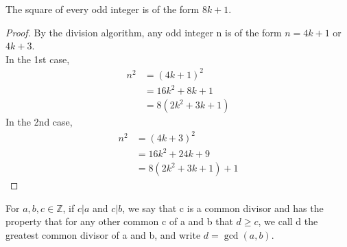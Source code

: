     \begin{theorem}
        The square of every odd integer is of the form $8k+1$.
        \begin{proof}
            By the division algorithm, any odd integer n is of the form $n=4k+1$ or 
            $4k+3$. \\
            In the 1st case,
            \begin{align*}
                n^2 &= (4k+1)^2 \\
                &= 16k^2+8k+1 \\
                &= 8(2k^2+3k+1)
            \end{align*}
            In the 2nd case,
            \begin{align*}
                n^2 &=(4k+3)^2 \\
                &= 16k^2+24k+9 \\
                &= 8(2k^2+3k+1)+1
            \end{align*}
        \end{proof}
    \end{theorem}

    \begin{definition}
        For $a,b,c\in\mathbb{Z}$, if $c|a$ and $c|b$, we say that c is a common divisor 
        and has the property that for any other common c of a and b that $d\geq c$, 
        we call d the greatest common divisor of a and b, and write $d=\gcd(a,b)$.
    \end{definition}
